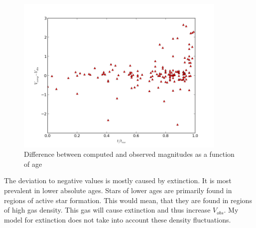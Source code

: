 \documentclass[a4paper,10pt]{article}
\begin{document}
 
 \begin{figure}[h!]
  \includegraphics[width=0.9\textwidth]{diffmagfracms}
  \caption{Difference between computed and observed magnitudes as a function of age}
 \end{figure}
 
 
 
 The deviation to negative values is mostly caused by extinction. It is most prevalent in lower absolute ages. 
 Stars of lower ages are primarily found in regions of active star formation. This would mean, that they are found in regions
 of high gas density. This gas will cause extinction and thus increase $V_{obs}$. My model for extinction does not take into account 
 these density fluctuations.
 
 \newpage
\end{document}
